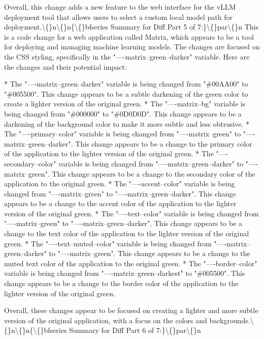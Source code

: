 \documentclass{article}
\begin{document}
{Overall, this change adds a new feature to the web interface for the vLLM deployment tool that allows users to select a custom local model path for deployment.\textbackslash\{\}n\textbackslash\{\}n\{\textbackslash\{\}bfseries Summary for Diff Part 5 of 7:\}\textbackslash\{\}par\textbackslash\{\}n  This is a code change for a web application called Matrix, which appears to be a tool for deploying and managing machine learning models. The changes are focused on the CSS styling, specifically in the "----matrix--green--darker" variable. Here are the changes and their potential impact:

* The "----matrix--green--darker" variable is being changed from "\#00AA00" to "\#005500". This change appears to be a subtle darkening of the green color to create a lighter version of the original green.
* The "----matrix--bg" variable is being changed from "\#000000" to "\#0D0D0D". This change appears to be a darkening of the background color to make it more subtle and less obtrusive.
* The "----primary--color" variable is being changed from "----matrix--green" to "----matrix--green--darker". This change appears to be a change to the primary color of the application to the lighter version of the original green.
* The "----secondary--color" variable is being changed from "----matrix--green--darker" to "----matrix--green". This change appears to be a change to the secondary color of the application to the original green.
* The "----accent--color" variable is being changed from "----matrix--green" to "----matrix--green--darker". This change appears to be a change to the accent color of the application to the lighter version of the original green.
* The "----text--color" variable is being changed from "----matrix--green" to "----matrix--green--darker". This change appears to be a change to the text color of the application to the lighter version of the original green.
* The "----text--muted--color" variable is being changed from "----matrix--green--darker" to "----matrix--green". This change appears to be a change to the muted text color of the application to the original green.
* The "----border--color" variable is being changed from "----matrix--green--darkest" to "\#005500". This change appears to be a change to the border color of the application to the lighter version of the original green.

Overall, these changes appear to be focused on creating a lighter and more subtle version of the original application, with a focus on the colors and backgrounds.\textbackslash\{\}n\textbackslash\{\}n\{\textbackslash\{\}bfseries Summary for Diff Part 6 of 7:\}\textbackslash\{\}par\textbackslash\{\}n 



}
\end{document}
